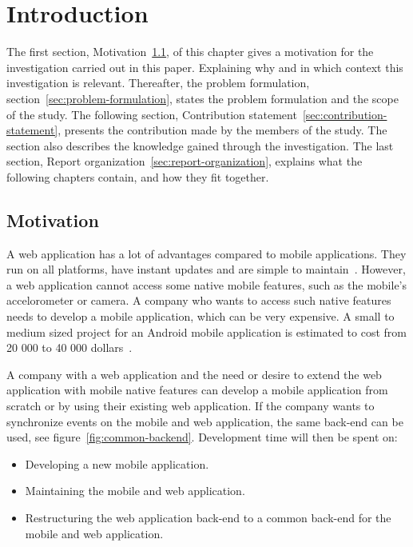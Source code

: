 \chapter{Introduction}\label{ch:introduction}
The first section, Motivation~\ref{sec:motivation}, of this chapter gives a motivation for the investigation carried out in this paper. Explaining why and in which context this investigation is relevant. Thereafter, the problem formulation, section~\ref{sec:problem-formulation}, states the problem formulation and the scope of the study. The following section, Contribution statement~\ref{sec:contribution-statement}, presents the contribution made by the members of the study. The section also describes the knowledge gained through the investigation. The last section, Report organization~\ref{sec:report-organization}, explains what the following chapters contain, and how they fit together.

\section{Motivation}\label{sec:motivation}
A web application has a lot of advantages compared to mobile applications. They run on all platforms, have instant updates and are simple to maintain~\cite{michaels2013}. However, a web application cannot access some native mobile features, such as the mobile's accelorometer or camera. A company who wants to access such native features needs to develop a mobile application, which can be very expensive. A small to medium sized project for an Android mobile application is estimated to cost from 20 000 to 40 000 dollars~\cite{kohan2015}.

A company with a web application and the need or desire to extend the web application with mobile native features can develop a mobile application from scratch or by using their existing web application. If the company wants to synchronize events on the mobile and web application, the same back-end can be used, see figure~\ref{fig:common-backend}. Development time will then be spent on:
\begin{itemize}
\item Developing a new mobile application.
\item Maintaining the mobile and web application.
\item Restructuring the web application back-end to a common back-end for the mobile and web application.
\end{itemize}

